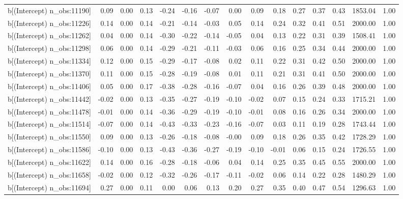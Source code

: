 \begin{table}[ht]
\begin{tabular}{rrrrrrrrrrrrrrr}
  b[(Intercept) n\_obs:11190] & 0.09 & 0.00 & 0.13 & -0.24 & -0.16 & -0.07 & 0.00 & 0.09 & 0.18 & 0.27 & 0.37 & 0.43 & 1853.04 & 1.00 \\ 
  b[(Intercept) n\_obs:11226] & 0.14 & 0.00 & 0.14 & -0.21 & -0.14 & -0.03 & 0.05 & 0.14 & 0.24 & 0.32 & 0.41 & 0.51 & 2000.00 & 1.00 \\ 
  b[(Intercept) n\_obs:11262] & 0.04 & 0.00 & 0.14 & -0.30 & -0.22 & -0.14 & -0.05 & 0.04 & 0.13 & 0.22 & 0.31 & 0.39 & 1508.41 & 1.00 \\ 
  b[(Intercept) n\_obs:11298] & 0.06 & 0.00 & 0.14 & -0.29 & -0.21 & -0.11 & -0.03 & 0.06 & 0.16 & 0.25 & 0.34 & 0.44 & 2000.00 & 1.00 \\ 
  b[(Intercept) n\_obs:11334] & 0.12 & 0.00 & 0.15 & -0.29 & -0.17 & -0.08 & 0.02 & 0.11 & 0.22 & 0.31 & 0.42 & 0.50 & 2000.00 & 1.00 \\ 
  b[(Intercept) n\_obs:11370] & 0.11 & 0.00 & 0.15 & -0.28 & -0.19 & -0.08 & 0.01 & 0.11 & 0.21 & 0.31 & 0.41 & 0.50 & 2000.00 & 1.00 \\ 
  b[(Intercept) n\_obs:11406] & 0.05 & 0.00 & 0.17 & -0.38 & -0.28 & -0.16 & -0.07 & 0.04 & 0.16 & 0.26 & 0.39 & 0.48 & 2000.00 & 1.00 \\ 
  b[(Intercept) n\_obs:11442] & -0.02 & 0.00 & 0.13 & -0.35 & -0.27 & -0.19 & -0.10 & -0.02 & 0.07 & 0.15 & 0.24 & 0.33 & 1715.21 & 1.00 \\ 
  b[(Intercept) n\_obs:11478] & -0.01 & 0.00 & 0.14 & -0.36 & -0.29 & -0.19 & -0.10 & -0.01 & 0.08 & 0.16 & 0.26 & 0.34 & 2000.00 & 1.00 \\ 
  b[(Intercept) n\_obs:11514] & -0.07 & 0.00 & 0.14 & -0.43 & -0.33 & -0.23 & -0.16 & -0.07 & 0.03 & 0.11 & 0.19 & 0.28 & 1743.44 & 1.00 \\ 
  b[(Intercept) n\_obs:11550] & 0.09 & 0.00 & 0.13 & -0.26 & -0.18 & -0.08 & -0.00 & 0.09 & 0.18 & 0.26 & 0.35 & 0.42 & 1728.29 & 1.00 \\ 
  b[(Intercept) n\_obs:11586] & -0.10 & 0.00 & 0.13 & -0.43 & -0.36 & -0.27 & -0.19 & -0.10 & -0.01 & 0.06 & 0.15 & 0.24 & 1726.55 & 1.00 \\ 
  b[(Intercept) n\_obs:11622] & 0.14 & 0.00 & 0.16 & -0.28 & -0.18 & -0.06 & 0.04 & 0.14 & 0.25 & 0.35 & 0.45 & 0.55 & 2000.00 & 1.00 \\ 
  b[(Intercept) n\_obs:11658] & -0.02 & 0.00 & 0.12 & -0.32 & -0.26 & -0.17 & -0.11 & -0.02 & 0.06 & 0.14 & 0.22 & 0.28 & 1480.29 & 1.00 \\ 
  b[(Intercept) n\_obs:11694] & 0.27 & 0.00 & 0.11 & 0.00 & 0.06 & 0.13 & 0.20 & 0.27 & 0.35 & 0.40 & 0.47 & 0.54 & 1296.63 & 1.00 \\ 

\end{tabular}
\end{table}
